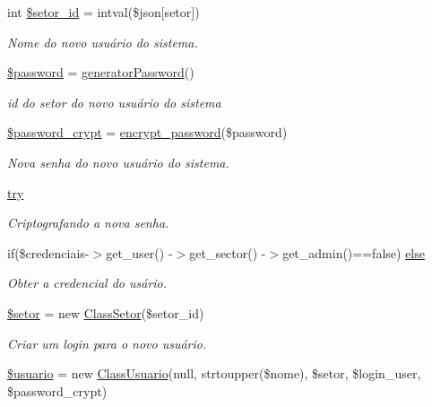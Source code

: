 \begin{DoxyCompactItemize}
int \hyperlink{menu_2configuracoes_2usuarios_2new_8php_a93c5ed26f2451c1cc65c3dfe545a913b}{\$setor\+\_\+id} = intval(\$json\mbox{[}\textquotesingle{}setor\textquotesingle{}\mbox{]})
\begin{DoxyCompactList}\small\item\em Nome do novo usuário do sistema. \end{DoxyCompactList}\item 
\hyperlink{menu_2configuracoes_2usuarios_2new_8php_a607686ef9f99ea7c42f4f3dd3dbb2b0d}{\$password} = \hyperlink{_header_8php_a8db8ce321ecc739cc840efd11c612b10}{generator\+Password}()
\begin{DoxyCompactList}\small\item\em id do setor do novo usuário do sistema \end{DoxyCompactList}\item 
\hyperlink{menu_2configuracoes_2usuarios_2new_8php_a08ad7edf008a5c99d28f03ea033f64f0}{\$password\+\_\+crypt} = \hyperlink{_header_8php_a5455ea8d21f7611dae58e3d4612fb3bd}{encrypt\+\_\+password}(\$password)
\begin{DoxyCompactList}\small\item\em Nova senha do novo usuário do sistema. \end{DoxyCompactList}\item 
\hyperlink{menu_2configuracoes_2usuarios_2new_8php_abe4cc9788f52e49485473dc699537388}{try}
\begin{DoxyCompactList}\small\item\em Criptografando a nova senha. \end{DoxyCompactList}\item 
if(\$credenciais-\/$>$get\+\_\+user() -\/$>$get\+\_\+sector() -\/$>$get\+\_\+admin()==false) \hyperlink{menu_2configuracoes_2usuarios_2new_8php_a8f5108ee2efdbfcd6f3d53b8abcb6c09}{else}
\begin{DoxyCompactList}\small\item\em Obter a credencial do usário. \end{DoxyCompactList}\item 
\hyperlink{menu_2configuracoes_2usuarios_2new_8php_a87435a25b7cae617cf284c729b6e835c}{\$setor} = new \hyperlink{class_class_setor}{Class\+Setor}(\$setor\+\_\+id)
\begin{DoxyCompactList}\small\item\em Criar um login para o novo usuário. \end{DoxyCompactList}\item 
\hyperlink{menu_2configuracoes_2usuarios_2new_8php_a559c8003f481610caf373b85cc607fb6}{\$usuario} = new \hyperlink{class_class_usuario}{Class\+Usuario}(null, strtoupper(\$nome), \$setor, \$login\+\_\+user, \$password\+\_\+crypt)

\end{DoxyCompactItemize}
